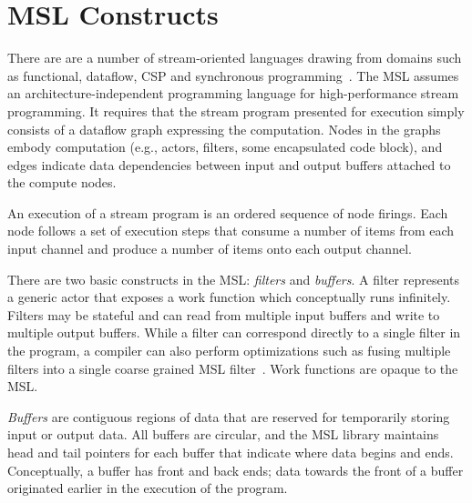 \section{MSL Constructs}

There are are a number of stream-oriented languages drawing from
domains such as functional, dataflow, CSP and synchronous
programming~\cite{survey97}. The MSL assumes an architecture-independent
programming language for high-performance stream programming. It
requires that the stream program presented for execution simply
consists of a dataflow graph expressing the computation. Nodes in the
graphs embody computation (e.g., actors, filters, some encapsulated
code block), and edges indicate data dependencies between
input and output buffers attached to the compute nodes.

An execution of a stream program is an ordered sequence of node
firings. Each node follows a set of execution steps that consume a
number of items from each input channel and produce a number of items
onto each output channel.

There are two basic constructs in the MSL: \emph{filters} and
\emph{buffers}. A filter represents a generic actor that exposes a
work function which conceptually runs infinitely. Filters may be
stateful and can read from multiple input buffers and write to multiple
output buffers. While a filter can correspond directly to a
single filter in the program, a compiler can also perform
optimizations such as fusing multiple filters into a single
coarse grained MSL filter~\cite{asplos02}. Work functions are opaque to the MSL.

\emph{Buffers} are contiguous regions of data that are reserved for
temporarily storing input or output data. All buffers are circular,
and the MSL library maintains head and tail pointers for each buffer
that indicate where data begins and ends. Conceptually, a buffer has
front and back ends; data towards the front of a buffer originated
earlier in the execution of the program.

